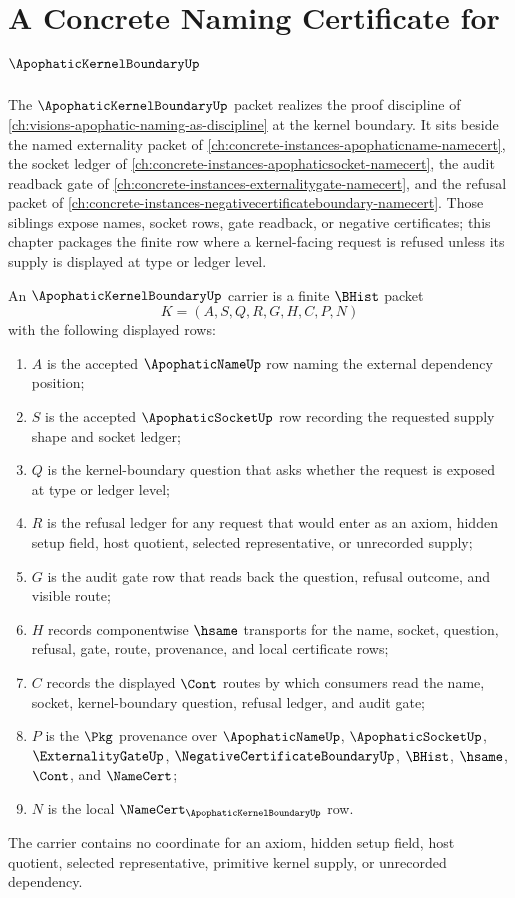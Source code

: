 \chapter{A Concrete Naming Certificate for $\ApophaticKernelBoundaryUp$}
\label{ch:concrete-instances-apophatic-kernel-boundary-namecert}

The $\ApophaticKernelBoundaryUp$ packet realizes the proof discipline of \autoref{ch:visions-apophatic-naming-as-discipline} at the kernel boundary. It sits beside the named externality packet of \autoref{ch:concrete-instances-apophaticname-namecert}, the socket ledger of \autoref{ch:concrete-instances-apophaticsocket-namecert}, the audit readback gate of \autoref{ch:concrete-instances-externalitygate-namecert}, and the refusal packet of \autoref{ch:concrete-instances-negativecertificateboundary-namecert}. Those siblings expose names, socket rows, gate readback, or negative certificates; this chapter packages the finite row where a kernel-facing request is refused unless its supply is displayed at type or ledger level.

\begin{definition}
\label{def:apophatic-kernel-boundary-carrier}
An $\ApophaticKernelBoundaryUp$ carrier is a finite $\BHist$ packet
$$
K=(A,S,Q,R,G,H,C,P,N)
$$
with the following displayed rows:
\begin{enumerate}
\item $A$ is the accepted $\ApophaticNameUp$ row naming the external dependency position;
\item $S$ is the accepted $\ApophaticSocketUp$ row recording the requested supply shape and socket ledger;
\item $Q$ is the kernel-boundary question that asks whether the request is exposed at type or ledger level;
\item $R$ is the refusal ledger for any request that would enter as an axiom, hidden setup field, host quotient, selected representative, or unrecorded supply;
\item $G$ is the audit gate row that reads back the question, refusal outcome, and visible route;
\item $H$ records componentwise $\hsame$ transports for the name, socket, question, refusal, gate, route, provenance, and local certificate rows;
\item $C$ records the displayed $\Cont$ routes by which consumers read the name, socket, kernel-boundary question, refusal ledger, and audit gate;
\item $P$ is the $\Pkg$ provenance over $\ApophaticNameUp$, $\ApophaticSocketUp$, $\ExternalityGateUp$, $\NegativeCertificateBoundaryUp$, $\BHist$, $\hsame$, $\Cont$, and $\NameCert$;
\item $N$ is the local $\NameCert_{\ApophaticKernelBoundaryUp}$ row.
\end{enumerate}
The carrier contains no coordinate for an axiom, hidden setup field, host quotient, selected representative, primitive kernel supply, or unrecorded dependency.
\end{definition}

